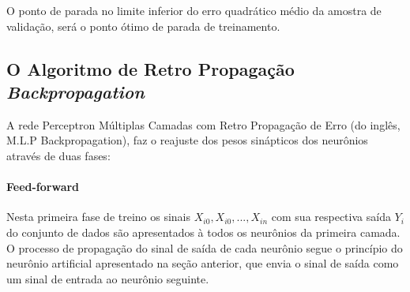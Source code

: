            	O ponto de parada no limite inferior do erro quadrático médio da amostra de validação, será o ponto ótimo de parada de treinamento.
          	
          	\begin{figure}[H]
          	\end{figure}
        

\subsection{O Algoritmo de Retro Propagação \textit{Backpropagation}}

        A rede Perceptron Múltiplas Camadas com Retro Propagação de Erro (do inglês, M.L.P Backpropagation), faz o reajuste dos pesos sinápticos dos neurônios através de duas fases:
  	       \paragraph*{Feed-forward} Nesta primeira fase de treino os sinais $X_{i0},X_{i0},...,X_{in}$ com sua respectiva saída $Y_i$ do conjunto de dados são apresentados à todos os neurônios da primeira camada. O processo de propagação do sinal de saída de cada neurônio segue o princípio do neurônio artificial apresentado na seção anterior, que envia o sinal de saída como um sinal de entrada ao neurônio seguinte.
  	       

